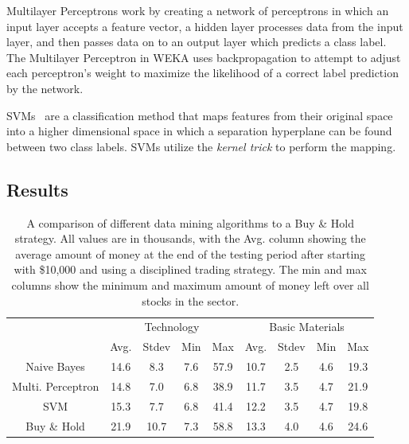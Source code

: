 \documentclass[10pt]{article}
\begin{document}
Multilayer Perceptrons work by creating a network of perceptrons in which an
input layer accepts a feature vector, a hidden layer processes data from the
input layer, and then passes data on to an output layer which predicts a class
label. The Multilayer Perceptron in WEKA uses backpropagation to attempt to
adjust each perceptron's weight to maximize the likelihood of a correct label
prediction by the network.

SVMs~\cite{vapnik2006estimation} are a classification method that maps features from
their original space into a higher dimensional space in which a separation
hyperplane can be found between two class labels. SVMs utilize the \emph{kernel
trick} to perform the mapping.


\subsection{Results} 
\label{sec:slresults}

\begin{table}
    \begin{center}
    \begin{tabular}{|c|c|c|c|c||c|c|c|c|}
        \hline
        \multirow{2}{*}{} & \multicolumn{4}{c||}{Technology} & \multicolumn{4}{c|}{Basic Materials} \\
        \cline{2-9}
                        & Avg. & Stdev & Min & Max & Avg. & Stdev & Min & Max\\
        \hline
        Naive Bayes & 14.6 & 8.3 & 7.6 & 57.9 & 10.7 & 2.5 & 4.6 & 19.3 \\
        \hline
        Multi. Perceptron & 14.8 & 7.0 & 6.8 & 38.9 & 11.7 & 3.5 & 4.7 & 21.9 \\
        \hline
        SVM & 15.3 & 7.7 & 6.8 & 41.4 & 12.2 & 3.5 & 4.7 & 19.8 \\
        \hline
        Buy \& Hold & 21.9 & 10.7 & 7.3 & 58.8 & 13.3 & 4.0 & 4.6 & 24.6 \\
        \hline
    \end{tabular}
    \end{center}
    \vspace{-0.5cm}
    \caption{A comparison of different data mining algorithms to a Buy \&
    Hold strategy. All values are in thousands, with the Avg. column showing
    the average amount of money at the end of the testing period after starting
    with \$10,000 and using a disciplined trading strategy. The min and max
    columns show the minimum and maximum amount of money left over all stocks
    in the sector.}

    \label{tab:testresults}
    \vspace{-0.1cm}
\end{table}
\end{document}

